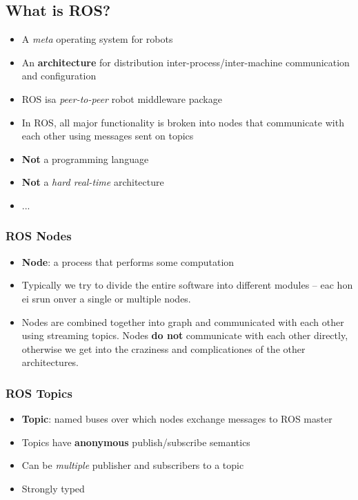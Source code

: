 \documentclass[13pt]{article}
\begin{document}
\subsection{What is ROS?}%
\noindent
\begin{itemize}
	\item A \textit{meta} operating system for robots
	\item An \textbf{architecture} for distribution inter-process/inter-machine communication and configuration
	\item ROS isa \textit{peer-to-peer} robot middleware package
	\item In ROS, all major functionality is broken into nodes that communicate with each other using messages sent
		on topics
	\item \textbf{Not} a programming language
	\item \textbf{Not} a \textit{hard real-time} architecture
	\item ...
\end{itemize}

\subsubsection{ROS Nodes}%
\noindent
\begin{itemize}
	\item \textbf{Node}: a process that performs some computation
	\item Typically we try to divide the entire software into different modules -- eac hon ei srun onver a single or
		multiple nodes.
	\item  Nodes are combined together into graph and communicated with each other using streaming topics. Nodes
		\textbf{do not} communicate with each other directly, otherwise we get into the craziness and complicationes of
		the other architectures.
\end{itemize}

\subsubsection{ROS Topics}%
\noindent
\begin{itemize}
	\item \textbf{Topic}: named buses over which nodes exchange messages to ROS master
	\item Topics have \textbf{anonymous} publish/subscribe semantics
	\item Can be \textit{multiple} publisher and subscribers to a topic
	\item Strongly typed
\end{itemize}
\end{document}

